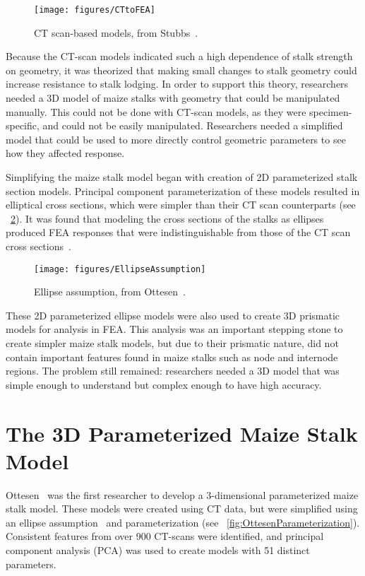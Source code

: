 \begin{figure}[htbp]
	\centering
	\texttt{[image: figures/CTtoFEA]}
	\caption[CT scan-based models.]{CT scan-based models, from Stubbs~\protect\cite{stubbs_maize_2022}.}
	\label{fig:CTtoFEA}
\end{figure}

Because the CT-scan models indicated such a high dependence of stalk strength on geometry, it was theorized that making small changes to stalk geometry could increase resistance to stalk lodging. In order to support this theory, researchers needed a 3D model of maize stalks with geometry that could be manipulated manually. This could not be done with CT-scan models, as they were specimen-specific, and could not be easily manipulated. Researchers needed a simplified model that could be used to more directly control geometric parameters to see how they affected response.

Simplifying the maize stalk model began with creation of 2D parameterized stalk section models. Principal component parameterization of these models resulted in elliptical cross sections, which were simpler than their CT scan counterparts (see ~\cref{fig:EllipseAssumption}). It was found that modeling the cross sections of the stalks as ellipses produced FEA responses that were indistinguishable from those of the CT scan cross sections~.

\begin{figure}[htbp]
	\centering
	\texttt{[image: figures/EllipseAssumption]}
	\caption[Ellipse assumption.]{Ellipse assumption, from Ottesen~\protect\cite{ottesen_parameterised_2022}.}
	\label{fig:EllipseAssumption}
\end{figure}

These 2D parameterized ellipse models were also used to create 3D prismatic models for analysis in FEA. This analysis was an important stepping stone to create simpler maize stalk models, but due to their prismatic nature, did not contain important features found in maize stalks such as node and internode regions. The problem still remained: researchers needed a 3D model that was simple enough to understand but complex enough to have high accuracy. 

\section{The 3D Parameterized Maize Stalk Model}
\label{sec:the_3d_parameterized_maize_stalk_model}
Ottesen~ was the first researcher to develop a 3-dimensional parameterized maize stalk model. These models were created using CT data, but were simplified using an ellipse assumption~ and parameterization (see  ~\cref{fig:OttesenParameterization}). Consistent features from over 900 CT-scans were identified, and principal component analysis (PCA) was used to create models with 51 distinct parameters. 

